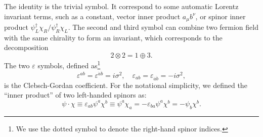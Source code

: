 The identity is the trivial symbol.
It correspond to some automatic Lorentz invariant terms, such as a constant, vector inner product $a_\mu b^\nu$, or spinor inner product $\psi_L^\dagger \chi_R/\psi_R^\dagger \chi_L$.
The second and third symbol can combine two fermion field with the same chirality to form an invariant, which corresponds to the decomposition 
\begin{equation}
	2 \otimes 2 = 1 \oplus 3.
\end{equation}
The two $\varepsilon$ symbols, defined as\footnote{We use the dotted symbol to denote the right-hand spinor indices.}
\begin{equation}
	\varepsilon^{ab} = \varepsilon^{\dot a \dot b} = i\sigma^2, \quad
	\varepsilon_{ab} = \varepsilon_{\dot a \dot b} = -i\sigma^2,
\end{equation}
is the Clebsch-Gordan coefficient.
For the notational simplicity, we defined the ``inner product'' of two left-handed spinors as:
\begin{equation}
	\psi\cdot\chi 
	\equiv \varepsilon_{ab}\psi^a\chi^b
	\equiv \psi^a\chi_{a}
	= -\varepsilon_{ba}\psi^a\chi^b
	= -\psi_b\chi^b.
\end{equation}


